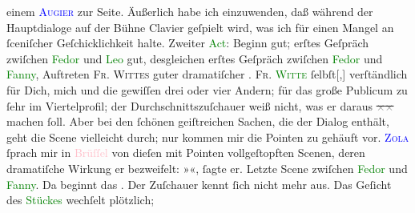 \documentclass[twoside=false,titlepage=false,open=any, parskip=never, fontsize=12pt, headings=small, chapterprefix=false, appendixprefix=false]{scrbook}
\newcommand{\strikeout}[1]{\sout{#1}}
\newcommand{\pbposition}{\depth}
\newcommand{\pb}{\nobreak\hspace{0pt}\raisebox{-0.1em}{\raisebox{\pbposition}{\textnormal{|}}}\nobreak\hspace{0pt}}
\begin{document}
               einem \textsc{\textcolor{blue}{Augier}{}\ledrightnote{\textcolor{blue}{Émile Augier}}} zur Seite. Äußerlich habe ich einzuwenden, daß während der Hauptdialoge auf der
               Bühne Clavier geſpielt wird, was ich für einen Mangel an ſceniſcher Geſchicklichkeit
               halte. Zweiter \textcolor{green}{Act}{}: Beginn
               gut; erſtes Geſpräch zwiſchen \textcolor{green}{Fedor}{} und \textcolor{green}{Leo}{} gut,
               desgleichen erſtes Geſpräch zwiſchen \textcolor{green}{Fedor}{} und \textcolor{green}{Fanny}{}, {\pb}Auftreten \textsc{Fr.
                  Wittes} guter dramatiſcher \label{K_L02674-6v}\label{K_L02674-6h}. \textsc{Fr. \textcolor{green}{Witte}{}}{ }ſelbſt{[},{]} verſtändlich für Dich,
               mich und die gewiſſen drei oder vier Andern; für das große Publicum zu ſehr im
               Viertelprofil; der Durchschnittszuſchauer weiß nicht, was er daraus \strikeout{\textcolor{gray}{×}\-\textcolor{gray}{×}} machen ſoll. Aber bei den ſchönen geiſtreichen Sachen, die der Dialog enthält,
               geht die Scene vielleicht durch; nur kommen mir die Pointen zu gehäuft vor. \textsc{\textcolor{blue}{Zola}{}\ledrightnote{\textcolor{blue}{Émile Zola}}} ſprach mir in \textcolor{pink}{Brüſſel}{}\ledrightnote{\textcolor{pink}{Brüssel}} von dieſen mit
               Pointen vollgeſtopften Scenen, deren dramatiſche Wirkung er bezweifelt: »\label{K_L02674-1v}\label{K_L02674-1h}«, ſagte er. Letzte Scene zwiſchen \textcolor{green}{Fedor}{} und \textcolor{green}{Fanny}{}. Da beginnt das \label{K_L02674-2v}\label{K_L02674-2h}. Der Zuſchauer kennt ſich nicht mehr aus. Das Geſicht des \textcolor{green}{Stückes}{} wechſelt plötzlich;
\end{document}
